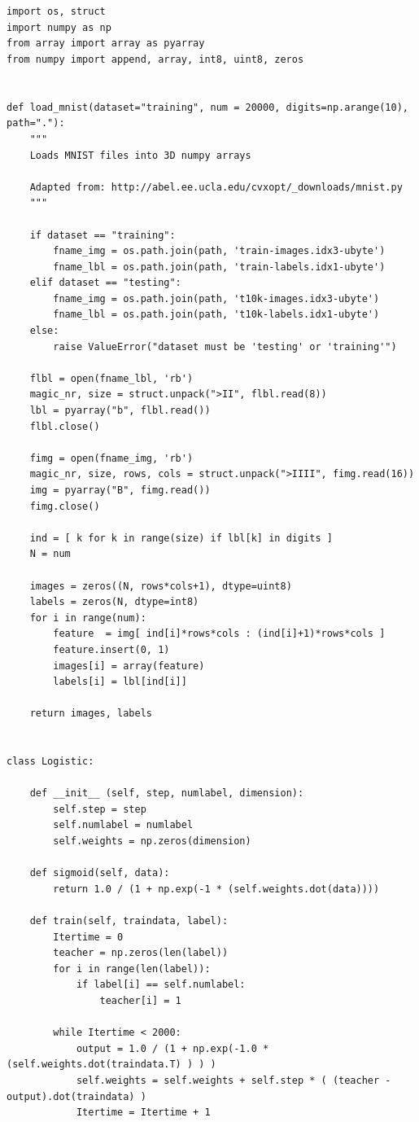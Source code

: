 \documentclass{article} %
\begin{document}
\begin{lstlisting}[frame=single]  % Start your code-block


import os, struct
import numpy as np
from array import array as pyarray
from numpy import append, array, int8, uint8, zeros


def load_mnist(dataset="training", num = 20000, digits=np.arange(10), path="."):
    """
    Loads MNIST files into 3D numpy arrays

    Adapted from: http://abel.ee.ucla.edu/cvxopt/_downloads/mnist.py
    """

    if dataset == "training":
        fname_img = os.path.join(path, 'train-images.idx3-ubyte')
        fname_lbl = os.path.join(path, 'train-labels.idx1-ubyte')
    elif dataset == "testing":
        fname_img = os.path.join(path, 't10k-images.idx3-ubyte')
        fname_lbl = os.path.join(path, 't10k-labels.idx1-ubyte')
    else:
        raise ValueError("dataset must be 'testing' or 'training'")

    flbl = open(fname_lbl, 'rb')
    magic_nr, size = struct.unpack(">II", flbl.read(8))
    lbl = pyarray("b", flbl.read())
    flbl.close()

    fimg = open(fname_img, 'rb')
    magic_nr, size, rows, cols = struct.unpack(">IIII", fimg.read(16))
    img = pyarray("B", fimg.read())
    fimg.close()

    ind = [ k for k in range(size) if lbl[k] in digits ]
    N = num

    images = zeros((N, rows*cols+1), dtype=uint8)
    labels = zeros(N, dtype=int8)
    for i in range(num):
        feature  = img[ ind[i]*rows*cols : (ind[i]+1)*rows*cols ]
        feature.insert(0, 1)
        images[i] = array(feature)
        labels[i] = lbl[ind[i]]

    return images, labels


class Logistic:

    def __init__ (self, step, numlabel, dimension):
        self.step = step
        self.numlabel = numlabel
        self.weights = np.zeros(dimension)

    def sigmoid(self, data):
        return 1.0 / (1 + np.exp(-1 * (self.weights.dot(data))))

    def train(self, traindata, label):
        Itertime = 0
        teacher = np.zeros(len(label))
        for i in range(len(label)):
            if label[i] == self.numlabel:
                teacher[i] = 1

        while Itertime < 2000:
            output = 1.0 / (1 + np.exp(-1.0 * (self.weights.dot(traindata.T) ) ) )
            self.weights = self.weights + self.step * ( (teacher - output).dot(traindata) )
            Itertime = Itertime + 1


\end{lstlisting}
\end{document}
